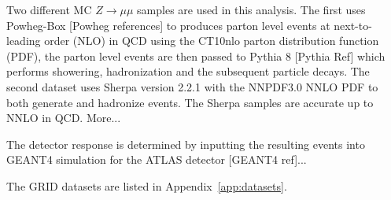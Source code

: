 Two different MC $Z\rightarrow\mu\mu$ samples are used in this analysis. The first uses Powheg-Box [Powheg references] to produces parton level events at next-to-leading order (NLO) in QCD using the CT10nlo parton distribution function (PDF), the parton level events are
then passed to Pythia 8 [Pythia Ref] which performs showering, hadronization and the subsequent particle decays.
The second dataset uses Sherpa version 2.2.1 with the NNPDF3.0 NNLO PDF to both generate and hadronize events. The Sherpa samples are accurate up to NNLO in QCD. More...

The detector response is determined by inputting the resulting events into GEANT4 simulation for the ATLAS detector [GEANT4 ref]...

The GRID datasets are listed in Appendix~\ref{app:datasets}.




